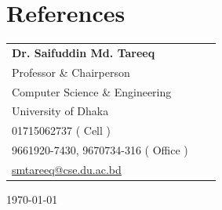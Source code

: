 \documentclass[a4paper,12pt]{article}
\begin{document}
\section{References}
\begin{table}[h]
\begin{tabular}{@{}lll@{}}
  \textbf{Dr. Saifuddin Md. Tareeq}\\
  Professor \& Chairperson\\
Computer Science \& Engineering\\
University of Dhaka\\
\faPhone{} 01715062737 ( Cell )\\
\faPhone{} 9661920-7430, 9670734-316 ( Office )\\
\faEnvelopeO{} \href{mailto:smtareeq@cse.du.ac.bd}{smtareeq@cse.du.ac.bd}\\
\end{tabular}
\end{table}

\noindent \today
\end{document}
